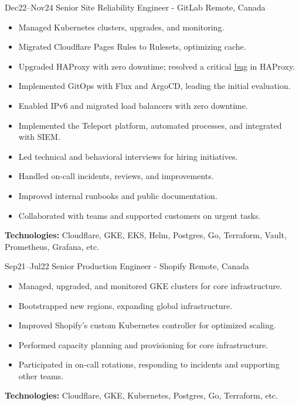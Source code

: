 \documentclass[]{cv-style}                     %
\begin{document}
\begin{entrylist}

  \entry
  {\small Dec22--Nov24}
  {Senior Site Reliability Engineer - GitLab}
  {Remote, Canada}
  {
    \begin{itemize}
      \item Managed Kubernetes clusters, upgrades, and monitoring.
      \item Migrated Cloudflare Pages Rules to Rulesets, optimizing cache.
      \item Upgraded HAProxy with zero downtime; resolved a critical \href{https://github.com/haproxy/haproxy/issues/2262}{bug} in HAProxy.
      \item Implemented GitOps with Flux and ArgoCD, leading the initial evaluation.
      \item Enabled IPv6 and migrated load balancers with zero downtime.
      \item Implemented the Teleport platform, automated processes, and integrated with SIEM.
      \item Led technical and behavioral interviews for hiring initiatives.
      \item Handled on-call incidents, reviews, and improvements.
      \item Improved internal runbooks and public documentation.
      \item Collaborated with teams and supported customers on urgent tasks.
    \end{itemize}
    \textbf{Technologies:} Cloudflare, GKE, EKS, Helm, Postgres, Go, Terraform, Vault, Prometheus, Grafana, etc.
  }

  \entry
  {\small Sep21--Jul22}
  {Senior Production Engineer - Shopify}
  {Remote, Canada}
  {
    \begin{itemize}
      \item Managed, upgraded, and monitored GKE clusters for core infrastructure.
      \item Bootstrapped new regions, expanding global infrastructure.
      \item Improved Shopify’s custom Kubernetes controller for optimized scaling.
      \item Performed capacity planning and provisioning for core infrastructure.
      \item Participated in on-call rotations, responding to incidents and supporting other teams.
    \end{itemize}
    \textbf{Technologies:} Cloudflare, GKE, Kubernetes, Postgres, Go, Terraform, etc.
  }


\end{entrylist}
\end{document}
